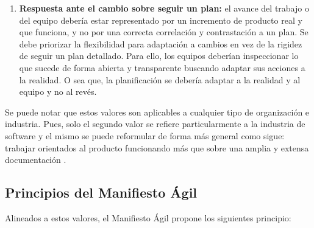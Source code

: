 \begin{enumerate}
\item \textbf{Respuesta ante el cambio sobre seguir un plan:} el avance del trabajo o del equipo debería estar representado por un incremento de producto real y que funciona, y no por una correcta correlación y contrastación a un plan. Se debe priorizar la flexibilidad para adaptación a cambios en vez de la rigidez de seguir un plan detallado. Para ello, los equipos deberían inspeccionar lo que sucede de forma abierta y transparente buscando adaptar sus acciones a la realidad. O sea que, la planificación se debería adaptar a la realidad y al equipo y no al revés.

\end{enumerate}

Se puede notar que estos valores son aplicables a cualquier tipo de organización e industria. Pues, solo el segundo valor se refiere particularmente a la industria de software y el mismo se puede reformular de forma más general como sigue: trabajar orientados al producto funcionando más que sobre una amplia y extensa documentación \cite{Sriram-Narayan-2015}.

\subsection{Principios del Manifiesto Ágil}

Alineados a estos valores, el Manifiesto Ágil propone los siguientes principio:

